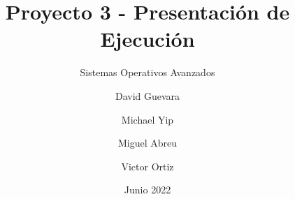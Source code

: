 \documentclass{beamer}
\title[]{Proyecto 3 - Presentación de Ejecución}
\subtitle{Sistemas Operativos Avanzados}
\author[SOA - Proyecto 3]{David Guevara \and  Michael Yip \and Miguel Abreu \and Victor Ortiz}
\institute[]{Maestría en Computación \\ Tecnológico de Costa Rica}
\date{Junio 2022}
\begin{document}
\frame{\titlepage}


% 

\end{document}
